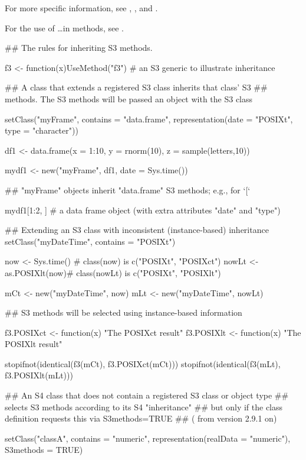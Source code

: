 %
\begin{SeeAlso}\relax
For more specific information, see
, , and
.

For the use of \dots in methods, see  .
\end{SeeAlso}
%
\begin{Examples}
\begin{ExampleCode}
## The rules for inheriting S3 methods.

f3 <- function(x)UseMethod("f3") # an S3 generic to illustrate inheritance

## A class that extends a registered S3 class inherits that class' S3
## methods.  The S3 methods will be passed an object with the S3 class

setClass("myFrame", contains = "data.frame",
    representation(date = "POSIXt", type = "character"))

df1 <- data.frame(x = 1:10, y = rnorm(10), z = sample(letters,10))

mydf1 <- new("myFrame", df1, date = Sys.time())

## "myFrame" objects inherit "data.frame" S3 methods; e.g., for `[`

mydf1[1:2, ] # a data frame object (with extra attributes "date" and "type")



## Extending an S3 class with inconsistent (instance-based) inheritance
setClass("myDateTime", contains = "POSIXt")

now <- Sys.time() # class(now) is c("POSIXt", "POSIXct")
nowLt <- as.POSIXlt(now)# class(nowLt) is c("POSIXt", "POSIXlt")

mCt <- new("myDateTime", now)
mLt <- new("myDateTime", nowLt)

## S3 methods will be selected using instance-based information

f3.POSIXct <- function(x) "The POSIXct result"
f3.POSIXlt <- function(x) "The POSIXlt result"

stopifnot(identical(f3(mCt), f3.POSIXct(mCt)))
stopifnot(identical(f3(mLt), f3.POSIXlt(mLt)))



## An S4 class that does not contain a registered S3 class or object type
## selects S3 methods according to its S4 "inheritance"
## but only if the class definition requests this via S3methods=TRUE
## ( from version 2.9.1 on)

setClass("classA", contains = "numeric",
   representation(realData = "numeric"), S3methods = TRUE)


\end{ExampleCode}
\end{Examples}
